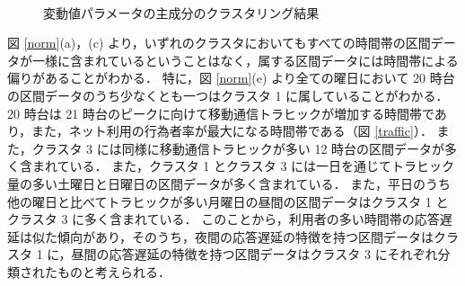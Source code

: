 \documentclass[technicalreport]{ieicej}
\begin{document}
\begin{figure}[tb]
\begin{center}
{}~
\\
\caption{変動値パラメータの主成分のクラスタリング結果}
\label{diff}
\end{center}
\end{figure}

図 \ref{norm}(a)，(c) より，いずれのクラスタにおいてもすべての時間帯の区間データが一様に含まれているということはなく，属する区間データには時間帯による偏りがあることがわかる．
特に，図 \ref{norm}(e) より全ての曜日において 20 時台の区間データのうち少なくとも一つはクラスタ 1 に属していることがわかる．
20 時台は 21 時台のピークに向けて移動通信トラヒックが増加する時間帯であり\cite{soumutrafficstatics}，また，ネット利用の行為者率が最大になる時間帯である\cite{soumuwhitepaper}（図 \ref{traffic}）．
また，クラスタ 3 には同様に移動通信トラヒックが多い 12 時台の区間データが多く含まれている．
また，クラスタ 1 とクラスタ 3 には一日を通じてトラヒック量の多い土曜日と日曜日の区間データが多く含まれている．
また，平日のうち他の曜日と比べてトラヒックが多い月曜日の昼間の区間データはクラスタ 1 とクラスタ 3 に多く含まれている．
このことから，利用者の多い時間帯の応答遅延は似た傾向があり，そのうち，夜間の応答遅延の特徴を持つ区間データはクラスタ 1 に，昼間の応答遅延の特徴を持つ区間データはクラスタ 3 にそれぞれ分類されたものと考えられる．
\end{document}
